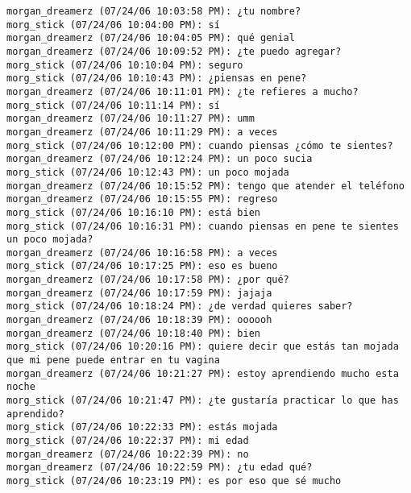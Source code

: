 \begin{verbatim}
morgan_dreamerz (07/24/06 10:03:58 PM): ¿tu nombre?
morg_stick (07/24/06 10:04:00 PM): sí 
morgan_dreamerz (07/24/06 10:04:05 PM): qué genial
morgan_dreamerz (07/24/06 10:09:52 PM): ¿te puedo agregar?
morg_stick (07/24/06 10:10:04 PM): seguro
morg_stick (07/24/06 10:10:43 PM): ¿piensas en pene?
morgan_dreamerz (07/24/06 10:11:01 PM): ¿te refieres a mucho?
morg_stick (07/24/06 10:11:14 PM): sí
morgan_dreamerz (07/24/06 10:11:27 PM): umm
morgan_dreamerz (07/24/06 10:11:29 PM): a veces
morg_stick (07/24/06 10:12:00 PM): cuando piensas ¿cómo te sientes?
morgan_dreamerz (07/24/06 10:12:24 PM): un poco sucia
morg_stick (07/24/06 10:12:43 PM): un poco mojada
morgan_dreamerz (07/24/06 10:15:52 PM): tengo que atender el teléfono
morgan_dreamerz (07/24/06 10:15:55 PM): regreso
morg_stick (07/24/06 10:16:10 PM): está bien
morg_stick (07/24/06 10:16:31 PM): cuando piensas en pene te sientes un poco mojada?
morgan_dreamerz (07/24/06 10:16:58 PM): a veces
morg_stick (07/24/06 10:17:25 PM): eso es bueno
morgan_dreamerz (07/24/06 10:17:58 PM): ¿por qué?
morgan_dreamerz (07/24/06 10:17:59 PM): jajaja
morg_stick (07/24/06 10:18:24 PM): ¿de verdad quieres saber?
morgan_dreamerz (07/24/06 10:18:39 PM): oooooh
morgan_dreamerz (07/24/06 10:18:40 PM): bien
morg_stick (07/24/06 10:20:16 PM): quiere decir que estás tan mojada que mi pene puede entrar en tu vagina
morgan_dreamerz (07/24/06 10:21:27 PM): estoy aprendiendo mucho esta noche
morg_stick (07/24/06 10:21:47 PM): ¿te gustaría practicar lo que has aprendido?
morg_stick (07/24/06 10:22:33 PM): estás mojada
morg_stick (07/24/06 10:22:37 PM): mi edad
morgan_dreamerz (07/24/06 10:22:39 PM): no
morgan_dreamerz (07/24/06 10:22:59 PM): ¿tu edad qué?
morg_stick (07/24/06 10:23:19 PM): es por eso que sé mucho
\end{verbatim}